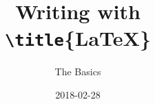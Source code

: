 \documentclass[aspectratio=1610,compress,t,gabaritb,french,english]{hecppt}
\title{Writing with \\ \texttt{\textbackslash title}\{\textrm{\LaTeX}\} }
\subtitle{The Basics}
\date[2018-02-28]{2018-02-28}
\begin{document}
\pageTitre









\end{document}
